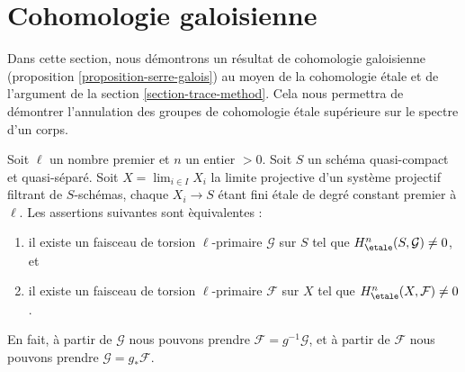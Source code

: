 \section{Cohomologie galoisienne}
\label{section-galois-cohomology}

\noindent
Dans cette section, nous d\'emontrons un r\'esultat de cohomologie galoisienne
(proposition \ref{proposition-serre-galois})
au moyen de la cohomologie \'etale et de l'argument de la
section \ref{section-trace-method}.
Cela nous permettra de d\'emontrer l'annulation des groupes de cohomologie \'etale sup\'erieure
sur le spectre d'un corps.

\begin{lemma}
\label{lemma-nonvanishing-inherited}
Soit $\ell$ un nombre premier et $n$ un entier $> 0$.
Soit $S$ un sch\'ema quasi-compact et quasi-s\'epar\'e.
Soit $X = \lim_{i \in I} X_i$ la limite projective d'un
syst\`eme projectif filtrant de $S$-sch\'emas, chaque $X_i \to S$
\'etant fini \'etale de degr\'e constant premier \`a $\ell$.
Les assertions suivantes sont \`equivalentes :
\begin{enumerate}
\item il existe un faisceau de torsion $\ell$-primaire
$\mathcal{G}$ sur $S$ tel que $H_\etale^n(S, \mathcal{G}) \neq 0$, et
\item il existe un faisceau de torsion $\ell$-primaire $\mathcal{F}$ sur $X$
tel que $H_\etale^n(X, \mathcal{F}) \neq 0$.
\end{enumerate}
En fait, \`a partir de
$\mathcal{G}$ nous pouvons prendre $\mathcal{F} = g^{-1}\mathcal{G}$,
et \`a partir de
$\mathcal{F}$ nous pouvons prendre $\mathcal{G} = g_*\mathcal{F}$.
\end{lemma}

